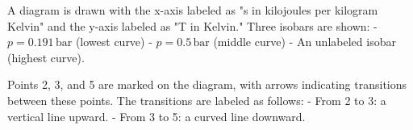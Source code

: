 A diagram is drawn with the x-axis labeled as "s in kilojoules per kilogram Kelvin" and the y-axis labeled as "T in Kelvin."  
Three isobars are shown:  
- \( p = 0.191 \, \text{bar} \) (lowest curve)  
- \( p = 0.5 \, \text{bar} \) (middle curve)  
- An unlabeled isobar (highest curve).  

Points 2, 3, and 5 are marked on the diagram, with arrows indicating transitions between these points. The transitions are labeled as follows:  
- From 2 to 3: a vertical line upward.  
- From 3 to 5: a curved line downward.